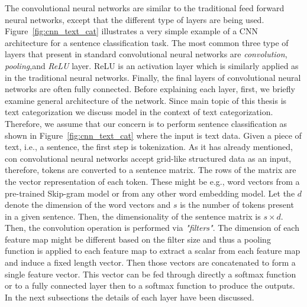 The convolutional neural networks are similar to the traditional feed forward neural networks, except that the different type of layers are being used. Figure~\ref{fig:cnn_text_cat} illustrates a very simple example of a CNN architecture for a sentence classification task. The most common three type of layers that present in standard convolutional neural networks are \textit{convolution}, \textit{pooling},and \textit{ReLU} layer. ReLU is an activation layer which is similarly applied as in the traditional neural networks. Finally, the final layers of convolutional neural networks  are often fully connected. %
Before explaining each layer, first, we briefly examine general architecture of the network. Since main topic of this thesis is text categorization we discuss model in the context of text categorization. Therefore, we assume that our concern is to perform sentence classification as shown in Figure~\ref{fig:cnn_text_cat} where the input is text data. Given a piece of text, i.e., a sentence, the first step is tokenization. As it has already mentioned, con
convolutional neural networks accept grid-like structured data as an input, therefore, tokens are converted to a sentence matrix. The rows of the matrix are the vector representation of each token. These might be e.g., word vectors from a pre-trained Skip-gram model or from any other word embedding model. Let the $d$ denote the dimension of the word vectors and $s$ is the number of tokens present in a given sentence. Then, the dimensionality of the sentence matrix is $s\times d$. Then, the convolution operation is performed via \textit{"filters"}. The dimension of each feature map might be different based on the filter size and thus a pooling function is applied to each feature map to extract a scalar from each feature map and induce a fixed length vector. Then those vectors are concatenated to form a single feature vector. This vector can be fed through directly a softmax function or to a fully connected layer then to a softmax function to produce the outputs. \\
In the next subsections the details of each layer have been discussed.  


